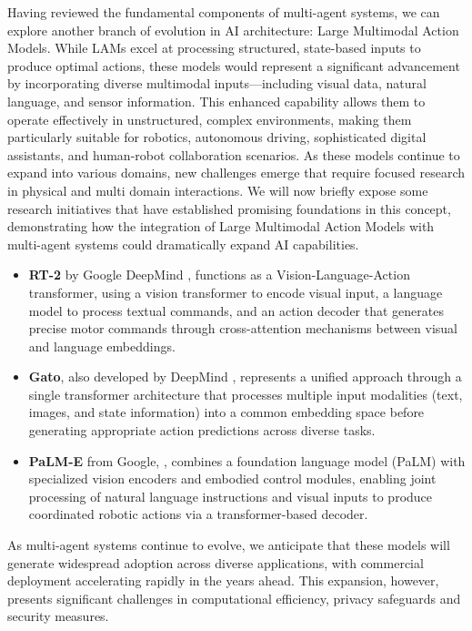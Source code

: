 \documentclass[journal,twoside,10pt]{IEEEtran}
\begin{document}
Having reviewed the fundamental components of multi-agent systems, we can explore another branch of evolution in AI architecture: Large Multimodal Action Models. 
While LAMs excel at processing structured, state-based inputs to produce optimal actions, these models would represent a significant advancement by incorporating diverse multimodal inputs—including visual data, natural language, and sensor information. This enhanced capability allows them to operate effectively in unstructured, complex environments, making them particularly suitable for robotics, autonomous driving, sophisticated digital assistants, and human-robot collaboration scenarios. 
As these models continue to expand into various domains, new challenges emerge that require focused research in physical and multi domain interactions. We will now briefly expose some research initiatives that have established promising foundations in this concept, demonstrating how the integration of Large Multimodal Action Models with multi-agent systems could dramatically expand AI capabilities.

\begin{itemize}
    \item \textbf{RT-2} by Google DeepMind \cite{brohan2023rt2}, functions as a Vision-Language-Action transformer, using a vision transformer to encode visual input, a language model to process textual commands, and an action decoder that generates precise motor commands through cross-attention mechanisms between visual and language embeddings.
    
    \item \textbf{Gato}, also developed by DeepMind \cite{reed2022generalist}, represents a unified approach through a single transformer architecture that processes multiple input modalities (text, images, and state information) into a common embedding space before generating appropriate action predictions across diverse tasks.
    
    \item \textbf{PaLM-E} from Google, \cite{driess2023palme}, combines a foundation language model (PaLM) with specialized vision encoders and embodied control modules, enabling joint processing of natural language instructions and visual inputs to produce coordinated robotic actions via a transformer-based decoder.
\end{itemize}

As multi-agent systems continue to evolve, we anticipate that these models will generate widespread adoption across diverse applications, with commercial deployment accelerating rapidly in the years ahead. This expansion, however, presents significant challenges in computational efficiency, privacy safeguards and security measures.
\end{document}

